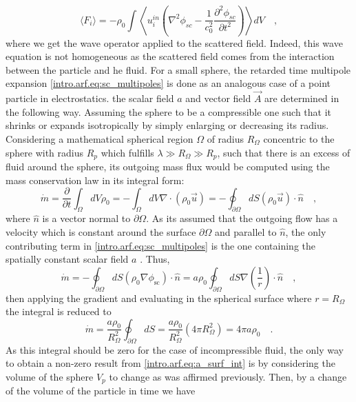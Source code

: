 \begin{equation}\label{eq:F_sc}
    \langle F_{i} \rangle = - \rho_0\int \left\langle u^{in}_i\left(\nabla^2\phi_{sc}-\frac{1}{c_0^2}\frac{\partial^2\phi_{sc}}{\partial  t^2}\right)\right\rangle dV\quad,
\end{equation}
where we get the wave operator applied to the scattered field. Indeed, this wave equation is not homogeneous as the scattered field comes from the interaction between the particle and he fluid. For a small sphere, the retarded time multipole expansion \eqref{intro.arf.eq:sc_multipoles} is done as an analogous case of a point particle in electrostatics. the scalar field $a$ and vector field $\vec A$ are determined in the following way. Assuming the sphere to be a compressible one such that it shrinks or expands isotropically by simply enlarging or decreasing its radius. Considering a mathematical spherical region $\Omega$ of radius $R_{\Omega}$ concentric to the sphere with radius $R_p$ which fulfills $\lambda\gg R_{\Omega}\gg R_p$, such that there is an excess of fluid around the sphere, its outgoing mass flux would be computed using the mass conservation law in its integral form: 
\begin{equation}
    \dot m = \frac{\partial}{\partial t}\int_{\Omega}dV \rho_0 = -\int_\Omega dV \nabla\cdot(\rho_0\vec u) = -\oint_{\partial\Omega} dS (\rho_0\vec u)\cdot\hat n\quad,
\end{equation}
where $\hat n$ is a vector normal to $\partial\Omega$. As its assumed that the outgoing flow has a velocity which is constant around the surface $\partial\Omega$ and parallel to $\hat n$, the only contributing term in \eqref{intro.arf.eq:sc_multipoles} is the one containing the spatially constant scalar field $a$ \cite[~p.282]{Landau}\cite[~p.70]{Manneberg2009}. Thus,
\begin{equation}
    \dot m = -\oint_{\partial\Omega} dS (\rho_0\nabla\phi_{\text{sc}})\cdot\hat n = a\rho_0\oint_{\partial\Omega} dS \nabla\left(\frac{1}{r}\right)\cdot\hat n\quad,
\end{equation}
then applying the gradient and evaluating in the spherical surface where $r=R_\Omega$ the integral is reduced to
\begin{equation}\label{intro.arf.eq:a_surf_int}
    \dot m = \frac{a\rho_0}{R_\Omega^2}\oint_{\partial\Omega} dS = \frac{a\rho_0}{R_\Omega^2} (4\pi R_\Omega^2) = 4\pi a\rho_0\quad.
\end{equation}
As this integral should be zero for the case of incompressible fluid, the only way to obtain a non-zero result from \eqref{intro.arf.eq:a_surf_int} is by considering the volume of the sphere $V_p$ to change as was affirmed previously. Then, by a change of the volume of the particle in time we have
